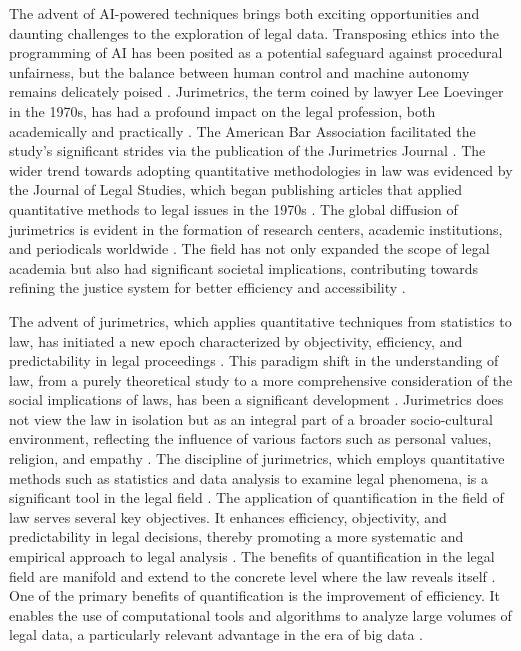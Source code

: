 The advent of AI-powered techniques brings both exciting opportunities and daunting challenges to the exploration of legal data. Transposing ethics into the programming of AI has been posited as a potential safeguard against procedural unfairness, but the balance between human control and machine autonomy remains delicately poised \cite{losano2006}. Jurimetrics, the term coined by lawyer Lee Loevinger in the 1970s, has had a profound impact on the legal profession, both academically and practically \cite{loevinger1959}. The American Bar Association facilitated the study's significant strides via the publication of the Jurimetrics Journal \cite{loevinger1959}. The wider trend towards adopting quantitative methodologies in law was evidenced by the Journal of Legal Studies, which began publishing articles that applied quantitative methods to legal issues in the 1970s \cite{loevinger1959}. The global diffusion of jurimetrics is evident in the formation of research centers, academic institutions, and periodicals worldwide \cite{loevinger1959}. The field has not only expanded the scope of legal academia but also had significant societal implications, contributing towards refining the justice system for better efficiency and accessibility \cite{loevinger1959}.

The advent of jurimetrics, which applies quantitative techniques from statistics to law, has initiated a new epoch characterized by objectivity, efficiency, and predictability in legal proceedings \cite{supiot2007}. This paradigm shift in the understanding of law, from a purely theoretical study to a more comprehensive consideration of the social implications of laws, has been a significant development \cite{losano2006}. Jurimetrics does not view the law in isolation but as an integral part of a broader socio-cultural environment, reflecting the influence of various factors such as personal values, religion, and empathy \cite{losano2006}. The discipline of jurimetrics, which employs quantitative methods such as statistics and data analysis to examine legal phenomena, is a significant tool in the legal field \cite{ajah2021}. The application of quantification in the field of law serves several key objectives. It enhances efficiency, objectivity, and predictability in legal decisions, thereby promoting a more systematic and empirical approach to legal analysis \cite{101111/lsi12334, camargo_2009}. The benefits of quantification in the legal field are manifold and extend to the concrete level where the law reveals itself \cite{camargo_2009}. One of the primary benefits of quantification is the improvement of efficiency. It enables the use of computational tools and algorithms to analyze large volumes of legal data, a particularly relevant advantage in the era of big data \cite{sareen_et_al_2020}.

